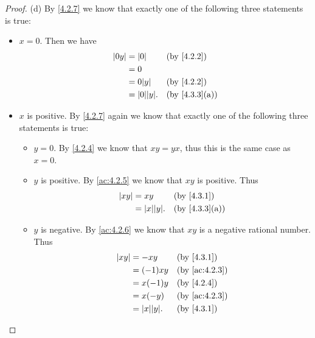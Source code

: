 \begin{proof}{(d)}
  By \cref{4.2.7} we know that exactly one of the following three statements is true:
  \begin{itemize}
    \item \(x = 0\).
          Then we have
          \begin{align*}
            \abs{0y} & = \abs{0}          &  & \text{(by \cref{4.2.2})}    \\
                     & = 0                                                 \\
                     & = 0 \abs{y}        &  & \text{(by \cref{4.2.2})}    \\
                     & = \abs{0} \abs{y}. &  & \text{(by \cref{4.3.3}(a))}
          \end{align*}
    \item \(x\) is positive.
          By \cref{4.2.7} again we know that exactly one of the following three statements is true:
          \begin{itemize}
            \item \(y = 0\).
                  By \cref{4.2.4} we know that \(xy = yx\), thus this is the same case as \(x = 0\).
            \item \(y\) is positive.
                  By \cref{ac:4.2.5} we know that \(xy\) is positive.
                  Thus
                  \begin{align*}
                    \abs{xy} & = xy               &  & \text{(by \cref{4.3.1})}    \\
                             & = \abs{x} \abs{y}. &  & \text{(by \cref{4.3.3}(a))}
                  \end{align*}
            \item \(y\) is negative.
                  By \cref{ac:4.2.6} we know that \(xy\) is a negative rational number.
                  Thus
                  \begin{align*}
                    \abs{xy} & = -xy              &  & \text{(by \cref{4.3.1})}    \\
                             & = (-1)xy           &  & \text{(by \cref{ac:4.2.3})} \\
                             & = x(-1)y           &  & \text{(by \cref{4.2.4})}    \\
                             & = x(-y)            &  & \text{(by \cref{ac:4.2.3})} \\
                             & = \abs{x} \abs{y}. &  & \text{(by \cref{4.3.1})}    \\

\end{align*}
\end{itemize}
\end{itemize}
\end{proof}
